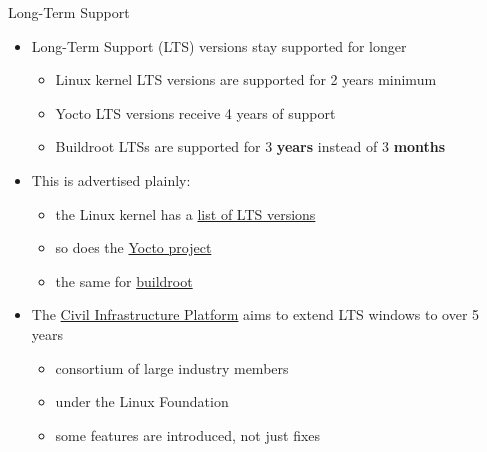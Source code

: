 \begin{frame}{Long-Term Support}
  \begin{itemize}
    \item Long-Term Support (LTS) versions stay supported for longer
    \begin{itemize}
      \item Linux kernel LTS versions are supported for 2 years minimum
      \item Yocto LTS versions receive 4 years of support
      \item Buildroot LTSs are supported for 3 \textbf{years} instead of 3 \textbf{months}
    \end{itemize}
    \item This is advertised plainly:
    \begin{itemize}
      \item the Linux kernel has a \href{https://www.kernel.org/category/releases.html}{list of LTS versions}
      \item so does the \href{https://www.yoctoproject.org/development/releases/}{Yocto project}
      \item the same for \href{https://buildroot.org/lts.html}{buildroot}
    \end{itemize}
    \item The \href{https://cip-project.org/}{Civil Infrastructure Platform}
	  aims to extend LTS windows to over 5 years
    \begin{itemize}
      \item consortium of large industry members
      \item under the Linux Foundation
      \item some features are introduced, not just fixes
    \end{itemize}
  \end{itemize}
\end{frame}
